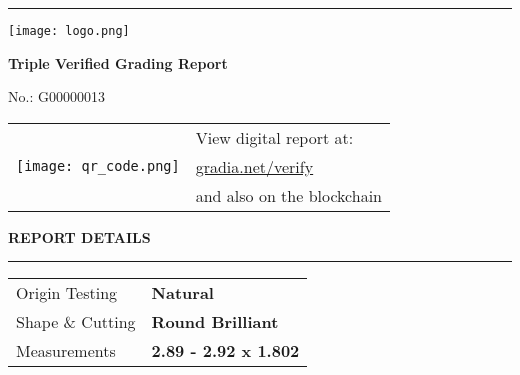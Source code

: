 \documentclass[12pt,landscape]{article}%
\begin{document}
%
\normalsize%
\renewcommand{\footnotesize}{\fontsize{6pt}{6pt}\selectfont}%
%
%
%
%
\color{white}%
\noindent\rule{\textwidth}{0.5mm}%
\vspace*{1em}%
\linebreak%
\color{MyDarkGrey}%
\begin{minipage}[t]{1\textwidth}%
\flushleft%
\begin{minipage}[t]{0.33333\textwidth}%
\centering%
\begin{minipage}[t]{0.9\textwidth}%
\flushleft%
\begin{center}%
\texttt{[image: logo.png]}%
\vspace*{1.5em}%
\linebreak%
\begin{large}%
\textbf{Triple Verified Grading Report}%
\end{large}%
\vspace*{0.7em}%
\linebreak%
\begin{large}%
No.: G00000013%
\end{large}%
\vspace*{0.5em}%
\linebreak%
\end{center}%
\renewcommand{\arraystretch}{1.3}%
\begin{tabular}{l l}%
\multirow{3}{*}{\texttt{[image: qr\_code.png]}}&View digital report at:\\%
&\color{MyBlue}\href{https://www.gradia.net/verify/G00000013}{gradia.net/verify}\\%
&and also on the blockchain\\%
\end{tabular}%
\vspace*{2.5em}%
\linebreak%
\color{MyBlue}%
\textbf{REPORT DETAILS\newline%
}%
\noindent\rule{\textwidth}{0.5mm}%
\vspace*{1em}%
\linebreak%
\color{MyDarkGrey}%
\renewcommand{\arraystretch}{1.5}%
\setlength{\tabcolsep}{1em}%
\begin{tabular}{l l}%
Origin Testing&\textbf{Natural}\\%
Shape \& Cutting&\textbf{Round Brilliant}\\%
Measurements&\textbf{2.89 {-} 2.92 x 1.802}\\%

\end{tabular}
\end{minipage}
\end{minipage}
\end{minipage}
\end{document}
